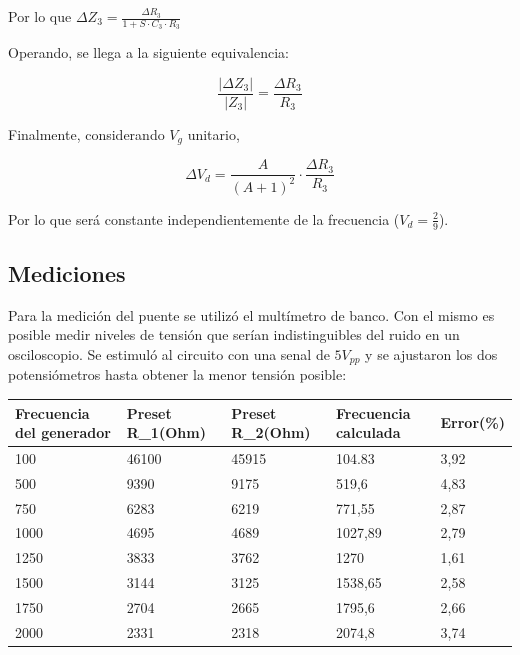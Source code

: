 Por lo que $\Delta Z_3 = \frac{\Delta R_3}{1+S \cdot C_3 \cdot R_3}$

Operando, se llega a la siguiente equivalencia:

\begin{equation}
\frac{|\Delta Z_3|}{|Z_3|} = \frac{\Delta R_3}{R_3}
\end{equation}

Finalmente, considerando $V_g$ unitario,

\begin{equation}
\Delta V_d = \frac{A}{(A+1)^2} \cdot \frac{\Delta R_3}{R_3}
\end{equation}

Por lo que ser\'a constante independientemente de la frecuencia ($V_d = \frac{2}{9}$).


\subsection{Mediciones}

Para la medici\'on del puente se utiliz\'o el mult\'imetro de banco. Con el mismo es posible medir niveles de tensi\'on que ser\'ian indistinguibles del ruido en un osciloscopio. Se estimul\'o al circuito con una senal de $5V_{pp}$ y se ajustaron los dos potensi\'ometros hasta obtener la menor tensi\'on posible:


\begin{table}[H]
\centering
\begin{tabular}{lllll}
Frecuencia del generador & Preset R\_1(Ohm) & Preset R\_2(Ohm) & Frecuencia calculada & Error(\%) \\ \hline
100                      & 46100            & 45915             & 104.83              & 3,92      \\
500                      & 9390             & 9175             & 519,6             & 4,83      \\
750                      & 6283             & 6219             & 771,55               & 2,87      \\
1000                     & 4695             & 4689             & 1027,89              & 2,79      \\
1250                     & 3833             & 3762             & 1270                 & 1,61      \\
1500                     & 3144             & 3125             & 1538,65              & 2,58      \\
1750                     & 2704             & 2665             & 1795,6               & 2,66      \\
2000                     & 2331             & 2318             & 2074,8               & 3,74     \\ \hline
\end{tabular}
\end{table}

